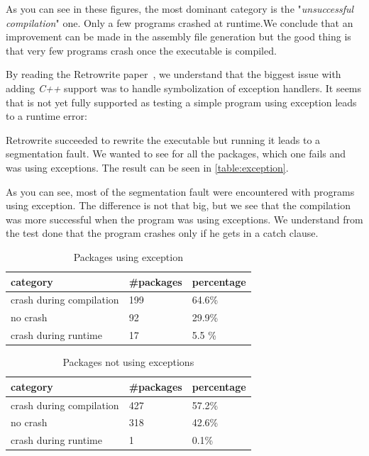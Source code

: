 \documentclass[a4paper,11pt,oneside]{report}
\newcommand{\sysname}{Retrowrite\xspace}
\begin{document}
As you can see in these figures, the most dominant category is the
"\textit{unsuccessful compilation}" one. Only a few programs crashed at
runtime.We conclude that an improvement can be made in the assembly file
generation but the good thing is that very few programs crash once the
executable is compiled.  

By reading the \sysname paper~\cite{dinesh20oakland}, we understand that
the biggest issue with adding \textit{C++} support was to handle symbolization
of exception handlers. It seems that is not yet fully supported as testing a
simple program using exception leads to a runtime error:



Retrowrite succeeded to rewrite the executable but running it leads to a
segmentation fault.
We wanted to see for all the packages, which one fails and was using
exceptions. The result can be seen in \autoref{table:exception}.

As you can see, most of the segmentation fault were encountered with programs
using exception. The difference is not that big, but we see that the compilation
was more successful when the program was using exceptions. We understand from
the test done that the program crashes only if he gets in a catch clause.

\begin{table}[H]
    \centering
    \begin{tabular}{lll} 
        \hline
        category                & \#packages & percentage \\ 
        \hline
        crash during compilation & 199 & 64.6\%      \\
        no crash                 & 92  & 29.9\%       \\
        crash during runtime     & 17  & 5.5 \%       \\
        \hline
    \end{tabular}
    \caption{Packages using exception}
    \label{table:exception}
\end{table}


\begin{table}[H]
    \centering
    \begin{tabular}{lll} 
        \hline
        category                & \#packages & percentage \\ 
        \hline
        crash during compilation & 427  & 57.2\%      \\
        no crash                 & 318  & 42.6\%      \\
        crash during runtime     & 1    & 0.1\%      \\
        \hline
    \end{tabular}
    \caption{Packages not using exceptions}
\end{table}
\end{document}
